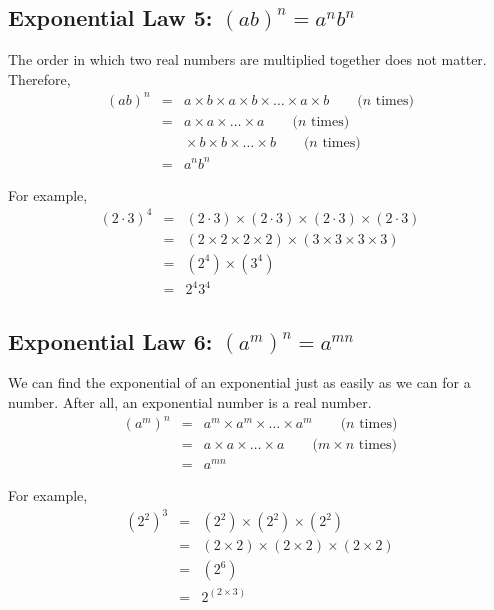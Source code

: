 \documentclass[10pt,a4paper,titlepage,twoside,openright]{report}
\begin{document}
\subsection{Exponential Law 5: $(ab)^n=a^nb^n$}
The order in which two real numbers are multiplied together does not matter. Therefore,
\begin{eqnarray}
\label{eq:mn:e:law5:proof}
(ab)^n &=& a\times b\times a\times b\times\ldots\times
a\times b \qquad\textrm{(}n\textrm{ times)}\\\nonumber
&=& a\times a\times\ldots\times a\qquad\textrm{(}n\textrm{ times)}\\\nonumber
&&\!\!\!\!\times b\times b\times\ldots\times b \qquad\textrm{(}n\textrm{ times)}\\\nonumber
&=& a^nb^n
\end{eqnarray}

For example,
\begin{eqnarray*}
(2\cdot 3)^4 &=&(2\cdot 3)\times(2\cdot 3)\times(2\cdot 3)\times(2\cdot 3)\\
&=&(2 \times 2 \times 2 \times 2)\times(3 \times 3 \times 3 \times 3)\\
&=&(2^4)\times(3^4)\\
&=&2^4 3^4
\end{eqnarray*}


\subsection{Exponential Law 6: $(a^m)^n=a^{mn}$}
We can find the exponential of an exponential just as easily as we can for a number. After all, an exponential number is a real number.
\begin{eqnarray}
\label{eq:mn:e:law6:proof}
(a^m)^n &=& a^m\times a^m\times\ldots\times a^m\qquad\textrm{(}n\textrm{ times)}\\\nonumber
&=& a\times a\times\ldots\times a\qquad\textrm{(}m\times n\textrm{ times)}\\\nonumber
&=& a^{mn}
\end{eqnarray}

For example,
\begin{eqnarray*}
(2^2)^3 &=&(2^2)\times(2^2)\times(2^2)\\
&=&(2 \times 2)\times(2 \times 2)\times(2 \times 2)\\
&=&(2^6)\\
&=&2^{(2\times3)}
\end{eqnarray*}
\end{document}
